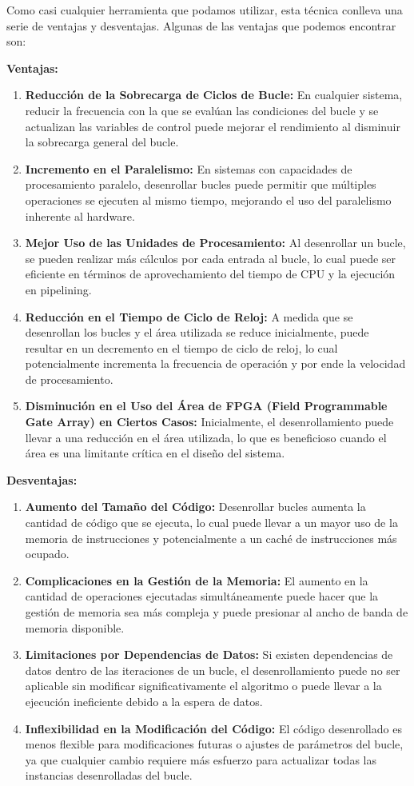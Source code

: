 \documentclass[a4paper,twocolumn]{article}
\begin{document}
Como casi cualquier herramienta que podamos utilizar, esta técnica conlleva una serie de ventajas y desventajas. Algunas de las ventajas que podemos encontrar son:

\textbf{Ventajas:}
\begin{enumerate}
	\item \textbf{Reducción de la Sobrecarga de Ciclos de Bucle:} En cualquier sistema, reducir la frecuencia con la que se evalúan las condiciones del bucle y se actualizan las variables de control puede mejorar el rendimiento al disminuir la sobrecarga general del bucle.
	\item \textbf{Incremento en el Paralelismo:} En sistemas con capacidades de procesamiento paralelo, desenrollar bucles puede permitir que múltiples operaciones se ejecuten al mismo tiempo, mejorando el uso del paralelismo inherente al hardware.
	\item \textbf{Mejor Uso de las Unidades de Procesamiento:} Al desenrollar un bucle, se pueden realizar más cálculos por cada entrada al bucle, lo cual puede ser eficiente en términos de aprovechamiento del tiempo de CPU y la ejecución en pipelining.
    \item \textbf{Reducción en el Tiempo de Ciclo de Reloj:} A medida que se desenrollan los bucles y el área utilizada se reduce inicialmente, puede resultar en un decremento en el tiempo de ciclo de reloj, lo cual potencialmente incrementa la frecuencia de operación y por ende la velocidad de procesamiento.
    \item \textbf{Disminución en el Uso del Área de FPGA (Field Programmable Gate Array) en Ciertos Casos:} Inicialmente, el desenrollamiento puede llevar a una reducción en el área utilizada, lo que es beneficioso cuando el área es una limitante crítica en el diseño del sistema.
\end{enumerate}

\textbf{Desventajas:}
\begin{enumerate}
	\item \textbf{Aumento del Tamaño del Código:} Desenrollar bucles aumenta la cantidad de código que se ejecuta, lo cual puede llevar a un mayor uso de la memoria de instrucciones y potencialmente a un caché de instrucciones más ocupado.
	\item \textbf{Complicaciones en la Gestión de la Memoria:} El aumento en la cantidad de operaciones ejecutadas simultáneamente puede hacer que la gestión de memoria sea más compleja y puede presionar al ancho de banda de memoria disponible.
	\item \textbf{Limitaciones por Dependencias de Datos:} Si existen dependencias de datos dentro de las iteraciones de un bucle, el desenrollamiento puede no ser aplicable sin modificar significativamente el algoritmo o puede llevar a la ejecución ineficiente debido a la espera de datos.
	\item \textbf{Inflexibilidad en la Modificación del Código:} El código desenrollado es menos flexible para modificaciones futuras o ajustes de parámetros del bucle, ya que cualquier cambio requiere más esfuerzo para actualizar todas las instancias desenrolladas del bucle.
\end{enumerate}
\end{document}
